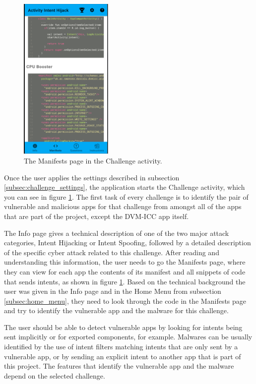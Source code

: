     \begin{figure}
        \centering
        \includegraphics[width=0.4\textwidth]{graphics/manifests.PNG}
        \caption{The Manifests page in the Challenge activity.}
        \label{fig:manifests_fragment}
    \end{figure}
        
    Once the user applies the settings described in subsection \ref{subsec:challenge_settings}, the application starts the Challenge activity, which you can see in figure \ref{fig:manifests_fragment}. The first task of every challenge is to identify the pair of vulnerable and malicious apps for that challenge from amongst all of the apps that are part of the project, except the DVM-ICC app itself. 
    
    The Info page gives a technical description of one of the two major attack categories, Intent Hijacking or Intent Spoofing, followed by a detailed description of the specific cyber attack related to this challenge. After reading and understanding this information, the user needs to go the Manifests page, where they can view for each app the contents of its manifest and all snippets of code that sends intents, as shown in figure \ref{fig:manifests_fragment}. Based on the technical background the user was given in the Info page and in the Home Menu from subsection \ref{subsec:home_menu}, they need to look through the code in the Manifests page and try to identify the vulnerable app and the malware for this challenge. 
    
    The user should be able to detect vulnerable apps by looking for intents being sent implicitly or for exported components, for example. Malwares can be usually identified by the use of intent filters matching intents that are only sent by a vulnerable app, or by sending an explicit intent to another app that is part of this project. The features that identify the vulnerable app and the malware depend on the selected challenge.
    
